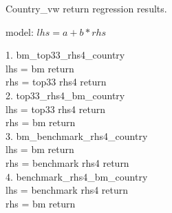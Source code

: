 

\usepackage[T1]{fontenc}




\thispagestyle{fancy}

\newcommand{\code}{\texttt}
\newcommand*{\Commonpath}{20190301/regression}

Country\_vw return regression results.

model: $lhs = a + b*rhs$

1. bm\_top33\_rhs4\_country\\
lhs = bm return \\
rhs = top33 rhs4 return \\




2. top33\_rhs4\_bm\_country\\
lhs = top33 rhs4 return \\
rhs = bm return \\




3. bm\_benchmark\_rhs4\_country\\
lhs = bm return \\
rhs = benchmark rhs4 return \\




4. benchmark\_rhs4\_bm\_country\\
lhs = benchmark rhs4 return \\
rhs = bm return \\




